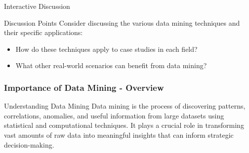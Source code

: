 \documentclass[aspectratio=169]{beamer}
\begin{document}
\begin{frame}[fragile]{Interactive Discussion}
    \begin{block}{Discussion Points}
        Consider discussing the various data mining techniques and their specific applications:
        \begin{itemize}
            \item How do these techniques apply to case studies in each field?
            \item What other real-world scenarios can benefit from data mining?
        \end{itemize}
    \end{block}
\end{frame}

\begin{frame}[fragile]
    \frametitle{Importance of Data Mining - Overview}
    \begin{block}{Understanding Data Mining}
        Data mining is the process of discovering patterns, correlations, anomalies, and useful information from large datasets using statistical and computational techniques. It plays a crucial role in transforming vast amounts of raw data into meaningful insights that can inform strategic decision-making.
    \end{block}
\end{frame}
\end{document}
